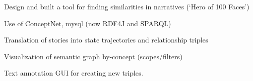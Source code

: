 \documentclass[letterpaper]{deedy-resume} %
\begin{document}
\begin{minipage}[t]{0.66\textwidth}
\sectionspace %




Design and built a tool for finding similarities in narratives (‘Hero of 100 Faces’)
\begin{tightitemize}
\item Use of ConceptNet, mysql (now RDF4J and SPARQL)
\item Translation of stories into state trajectories and relationship triples
\item Visualization of semantic graph by-concept (scopes/filters)
\item Text annotation GUI for creating new triples.
\end{tightitemize}

\sectionspace %




\end{minipage} %


\newpage %


\end{document}

